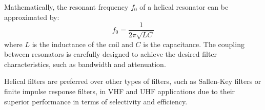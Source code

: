 Mathematically, the resonant frequency \( f_0 \) of a helical resonator can be approximated by:
\[
f_0 = \frac{1}{2\pi\sqrt{LC}}
\]
where \( L \) is the inductance of the coil and \( C \) is the capacitance. The coupling between resonators is carefully designed to achieve the desired filter characteristics, such as bandwidth and attenuation.

Helical filters are preferred over other types of filters, such as Sallen-Key filters or finite impulse response filters, in VHF and UHF applications due to their superior performance in terms of selectivity and efficiency.

